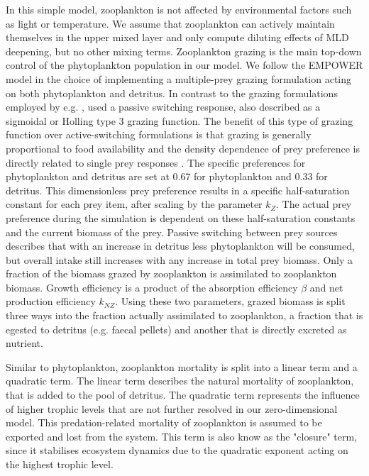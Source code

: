 \documentclass[journal abbreviation, manuscript]{copernicus}
\begin{document}
In this simple model, zooplankton is not affected by environmental factors such as light or temperature. We assume that zooplankton can actively maintain themselves in the upper mixed layer and only compute diluting effects of MLD deepening, but no other mixing terms. 
Zooplankton grazing is the main top-down control of the phytoplankton population in our model. We follow the EMPOWER model in the choice of implementing a multiple-prey grazing formulation acting on both phytoplankton and detritus. In contrast to the grazing formulations employed by e.g. \cite{Fasham1990a}, \citeauthor{Anderson2015c} used a passive switching response, also described as a sigmoidal or Holling type 3 grazing function. The benefit of this type of grazing function over active-switching formulations is that grazing is generally proportional to food availability and the density dependence of prey preference is directly related to single prey responses \citep{Gentleman2003a}.
The specific preferences for phytoplankton and detritus are set at 0.67 for phytoplankton and 0.33 for detritus. This dimensionless prey preference results in a specific half-saturation constant for each prey item, after scaling by the parameter $k_Z$. The actual prey preference during the simulation is dependent on these half-saturation constants and the current biomass of the prey. Passive switching between prey sources describes that with an increase in detritus less phytoplankton will be consumed, but overall intake still increases with any increase in total prey biomass. 
Only a fraction of the biomass grazed by zooplankton is assimilated to zooplankton biomass. Growth efficiency is a product of the absorption efficiency $\beta$ and net production efficiency $k_{NZ}$. Using these two parameters, grazed biomass is split three ways into the fraction actually assimilated to zooplankton, a fraction that is egested to detritus (e.g. faecal pellets) and another that is directly excreted as nutrient. 

Similar to phytoplankton, zooplankton mortality is split into a linear term and a quadratic term. The linear term describes the natural mortality of zooplankton, that is added to the pool of detritus. The quadratic term represents the influence of higher trophic levels that are not further resolved in our zero-dimensional model. This predation-related mortality of zooplankton is assumed to be exported and lost from the system.
This term is also know as the "closure" term, since it stabilises ecosystem dynamics due to the quadratic exponent acting on the highest trophic level.\\
\end{document}
